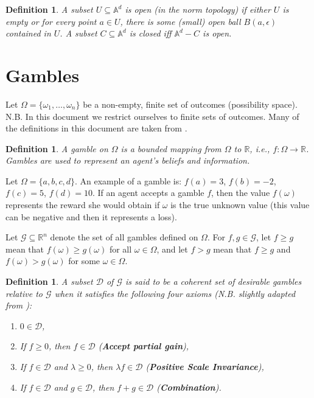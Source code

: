 \documentclass{article}
\theoremstyle{mytheorem}
\newtheorem{definition}[theorem]{Definition}
\newcommand{\set}[1]{\ensuremath{\{ #1 \} }} %
\begin{document}
\begin{definition}
A subset $U \subseteq \mathbb{A}^d$ is \emph{open} (in the norm topology) if either $U$ is empty or for every point $a \in U$, there is some (small) open ball $B(a, \epsilon)$ contained in $U$. A subset $C \subseteq \mathbb{A}^d$ is \emph{closed} iff $\mathbb{A}^d - C$ is open.
\end{definition}

\clearpage
\section{Gambles}
Let $\Omega = \set{\omega_1, \ldots, \omega_n}$ be a non-empty, finite set of outcomes (possibility space). N.B. In this document we restrict ourselves to finite sets of outcomes. Many of the definitions in this document are taken from \cite{Couso2009}.

\begin{definition}
A \emph{gamble on $\Omega$} is a bounded mapping
from $\Omega$ to $\mathbb{R}$, i.e., $f: \Omega \rightarrow \mathbb{R}$. Gambles are used to represent an agent’s beliefs and information.
\end{definition}

\noindent
Let $\Omega = \set{a, b, c, d}$. An example of a gamble is: $f(a) = 3$, $f(b) = -2$, $f(c) = 5$, $f(d) = 10$.
If an agent accepts a gamble $f$, then the value $f(\omega)$ represents the reward she would obtain if $\omega$ is the true unknown value (this value can be negative and then it represents a loss).

\vspace{0.5cm}
\noindent
Let $\mathcal{G} \subseteq \mathbb{R}^n$ denote the set of all gambles defined on $\Omega$. For
$f, g \in \mathcal{G}$, let $f \geq g$ mean that $f(\omega) \geq g (\omega)$ for all $\omega \in \Omega$, and let $f > g$ mean that $f \geq g$ and
$f(\omega) > g (\omega)$ for some $\omega \in \Omega$.

\begin{definition}
A subset $\mathcal{D}$ of $\mathcal{G}$ is said to be a \emph{coherent set of desirable gambles} relative to $\mathcal{G}$ when it satisfies the following
four axioms (N.B. slightly adapted from \cite{Couso2009}):
\begin{enumerate}
    \item [D1.] $0 \in \mathcal{D}$,
    \item [D2.] If $f \geq 0$, then $f \in \mathcal{D}$ (\textbf{Accept partial gain}),
    \item [D3.] If $f \in \mathcal{D}$ and $\lambda \geq 0$, then $\lambda f \in \mathcal{D}$ (\textbf{Positive Scale Invariance}),
    \item [D4.] If $f \in \mathcal{D}$ and $g \in \mathcal{D}$, then $f + g \in \mathcal{D}$ (\textbf{Combination}).
\end{enumerate}
\end{definition}
\end{document}
